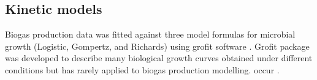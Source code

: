 \subsection{Kinetic models}
Biogas production data was fitted against three model formulas for microbial growth (Logistic, Gompertz, and Richards) using grofit software \cite{Kahm_2010}. Grofit package was developed to describe many biological growth curves obtained under different conditions but has rarely applied to biogas production modelling.
occur \cite{Kahm_2010}.